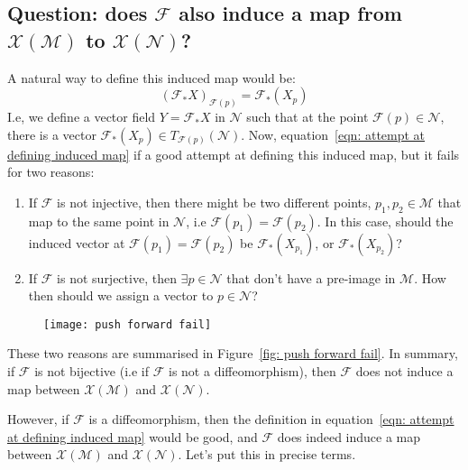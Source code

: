     \subsection*{Question: does $\mathcal{F}$ also induce a map from
    $\mathcal{X}(\mathcal{M})$ to $\mathcal{X}(\mathcal{N})$?}
      A natural way to define this induced map would be:
      \begin{equation}
        \label{eqn: attempt at defining induced map}
        \left(\mathcal{F}_{*}X\right)_{\mathcal{F}(p)} =
        \mathcal{F}_{*}(X_p)
      \end{equation}
      I.e, we define a vector field $Y = \mathcal{F}_{*}X$ in $\mathcal{N}$
      such that at the point $\mathcal{F}(p) \in \mathcal{N}$, there is a
      vector $\mathcal{F}_{*}(X_p) \in T_{\mathcal{F}(p)}(\mathcal{N})$.
      Now, equation~\ref{eqn: attempt at defining induced map} if a good attempt at defining this induced map, but it fails for two reasons:
      \begin{enumerate}
        \item{If $\mathcal{F}$ is not injective, then there might be two
        different points, $p_1,p_2 \in \mathcal{M}$ that map to the same
        point in $\mathcal{N}$, i.e $\mathcal{F}(p_1) = \mathcal{F}(p_2)$.
        In this case, should the induced vector at $\mathcal{F}(p_1) =
        \mathcal{F}(p_2)$ be $\mathcal{F}_{*}(X_{p_1})$, or
        $\mathcal{F}_{*}(X_{p_2})$?}
        \item{If $\mathcal{F}$ is not surjective, then $\exists p \in
        \mathcal{N}$ that don't have a pre-image in $\mathcal{M}$. How then
        should we assign a vector to $p\in \mathcal{N}$?}
      \end{enumerate}
      \begin{figure}
        \centering
        \texttt{[image: push forward fail]}
        \caption[]{}
        \label{fig: push forward fail}
      \end{figure}
      These two reasons are summarised in Figure~\ref{fig: push forward
      fail}. In summary, if $\mathcal{F}$ is not bijective (i.e if
      $\mathcal{F}$ is not a diffeomorphism), then $\mathcal{F}$ does not
      induce a map between $\mathcal{X}(\mathcal{M})$ and
      $\mathcal{X}(\mathcal{N})$.

      However, if $\mathcal{F}$ is a diffeomorphism, then the definition in
      equation~\ref{eqn: attempt at defining induced map} would be good,
      and $\mathcal{F}$ does indeed induce a map between
      $\mathcal{X}(\mathcal{M})$ and $\mathcal{X}(\mathcal{N})$. Let's put this in precise terms.
      
